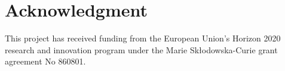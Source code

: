 \documentclass[sw]{iosart2x}
\providecommand{\DIFdelend}{} %
\DeclareRobustCommand{\DIFdelend}{\DIFOaddend \let\includegraphics\DIFOincludegraphics} %
\begin{document}
\DIFdelend 


\section{Acknowledgment}\label{s7}
This project has received funding from the European Union’s Horizon 2020 research and innovation program under the Marie Skłodowska-Curie grant agreement No 860801.





\end{document}
